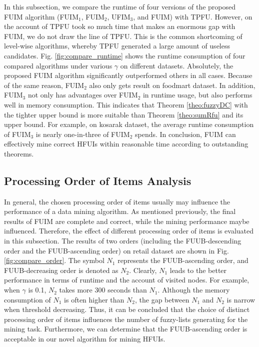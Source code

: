 \documentclass[journal]{IEEEtran}
\begin{document}
In this subsection, we compare the runtime of four versions of the proposed FUIM algorithm (FUIM$_1$, FUIM$_2$, UFIM$_3$, and FUIM) with TPFU. However, on the account of TPFU took so much time that makes an enormous gap with FUIM, we do not draw the line of TPFU. This is the common shortcoming of level-wise algorithms, whereby TPFU generated a large amount of useless candidates. Fig. \ref{fig:compare_runtime} shows the runtime consumption of four compared algorithms under various $\gamma$ on different datasets. Absolutely, the proposed FUIM algorithm significantly outperformed others in all cases. Because of the same reason, FUIM$_2$ also only gets result on foodmart dataset. In addition, FUIM$_{3}$ not only has advantages over FUIM$_{2}$ in runtime usage, but also performs well in memory consumption. This indicates that Theorem \ref{theo:fuzzyDC} with the tighter upper bound is more suitable than Theorem \ref{theo:sumRfu} and its upper bound. For example, on kosarak dataset, the average runtime consumption of FUIM$_3$ is nearly one-in-three of  FUIM$_{2}$ spends. In conclusion, FUIM can effectively mine correct HFUIs within reasonable time according to outstanding theorems.



\subsection{Processing Order of Items Analysis}

In general, the chosen processing order of items usually may influence the performance of a data mining algorithm. As mentioned previously, the final results of FUIM are complete and correct, while the mining performance maybe influenced. Therefore, the effect of different processing order of items is evaluated in this subsection. The results of two orders (including the FUUB-descending order and the FUUB-ascending order) on retail dataset are shown in Fig. \ref{fig:compare_order}. The symbol $N_1$ represents the FUUB-ascending order, and FUUB-decreasing order is denoted as $N_2$. Clearly, $N_1$ leads to the better performance in terms of runtime and the account of visited nodes. For example, when $\gamma$ is 0.1\textperthousand, $N_2$ takes more 300 seconds than $N_1$. Although the memory consumption of $N_1$ is often higher than $N_2$, the gap between $N_1$ and $N_2$ is narrow when threshold decreasing. Thus, it can be concluded that the choice of distinct processing order of items influences the number of fuzzy-lists generating for the mining task. Furthermore, we can determine that the FUUB-ascending order is acceptable in our novel algorithm for mining HFUIs.
\end{document}
